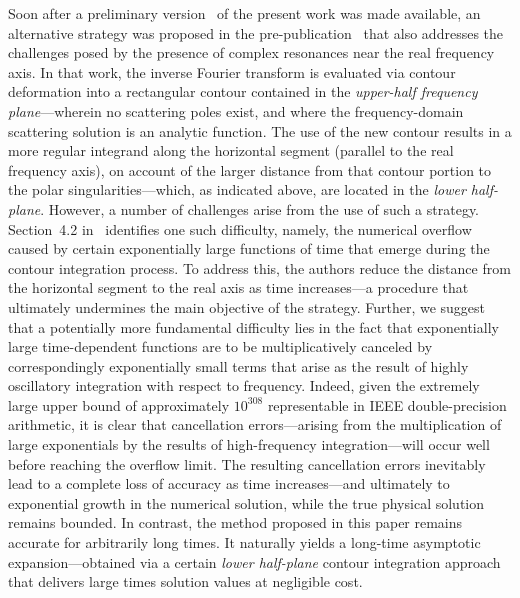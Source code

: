 \documentclass[11pt]{article}
\theoremstyle{plain}
\theoremstyle{remark}
\begin{document}
Soon after a preliminary version~\cite{bruno2025efficient} of the
present work was made available, an alternative strategy was proposed
in the pre-publication~\cite{wilber2025time} that also addresses the
challenges posed by the presence of complex resonances near the real
frequency axis.  In that work, the inverse Fourier transform is
evaluated via contour deformation into a rectangular contour contained
in the {\em upper-half frequency plane}---wherein no scattering poles
exist, and where the frequency-domain scattering solution is an
analytic function. The use of the new contour results in a more
regular integrand along the horizontal segment (parallel to the real
frequency axis), on account of the larger distance from that contour
portion to the polar singularities---which, as indicated above, are
located in the {\em lower half-plane}. However, a number of challenges
arise from the use of such a strategy. Section~4.2
in~\cite{wilber2025time} identifies one such difficulty, namely, the
numerical overflow caused by certain exponentially large functions of
time that emerge during the contour integration process. To address
this, the authors reduce the distance from the horizontal segment to
the real axis as time increases---a procedure that ultimately
undermines the main objective of the strategy. Further, we suggest
that a potentially more fundamental difficulty lies in the fact that
exponentially large time-dependent functions are to be
multiplicatively canceled by correspondingly exponentially small
terms that arise as the result of highly oscillatory integration with
respect to frequency. Indeed, given the extremely large upper bound of
approximately $10^{308}$ representable in IEEE double-precision
arithmetic, it is clear that cancellation errors—arising from the
multiplication of large exponentials by the results of high-frequency
integration—will occur well before reaching the overflow limit.  The
resulting cancellation errors inevitably lead to a complete loss of
accuracy as time increases---and ultimately to exponential growth in
the numerical solution, while the true physical solution remains
bounded. In contrast, the method proposed in this paper remains
accurate for arbitrarily long times. It naturally yields a long-time
asymptotic expansion—obtained via a certain {\em lower half-plane}
contour integration approach that delivers large times solution values
at negligible cost.
\end{document}

